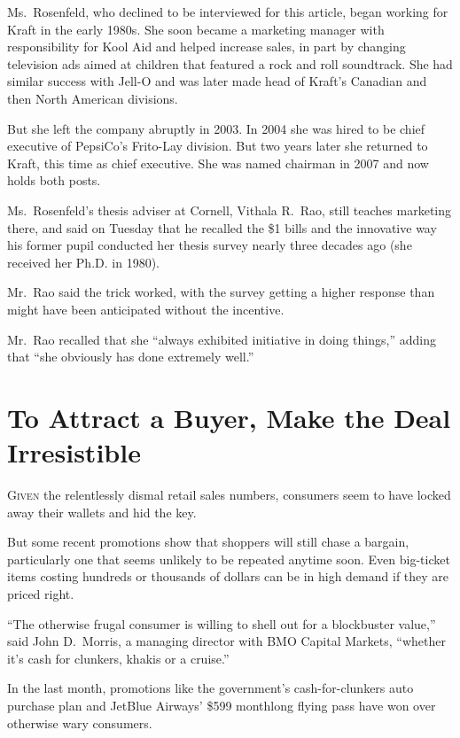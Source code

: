 ﻿\documentclass[12pt]{article}
\begin{document}
Ms.~Rosenfeld, who declined to be interviewed for this article, began working for Kraft in the early
1980s. She soon became a marketing manager with responsibility for Kool Aid and helped increase
sales, in part by changing television ads aimed at children that featured a rock and roll
soundtrack. She had similar success with Jell-O and was later made head of Kraft's Canadian and then
North American divisions.

But she left the company abruptly in 2003. In 2004 she was hired to be chief executive of PepsiCo's
Frito-Lay division. But two years later she returned to Kraft, this time as chief executive. She was
named chairman in 2007 and now holds both posts.

Ms.~Rosenfeld's thesis adviser at Cornell, Vithala R.~Rao, still teaches marketing there, and said
on Tuesday that he recalled the \$1 bills and the innovative way his former pupil conducted her
thesis survey nearly three decades ago (she received her Ph.D. in 1980).

Mr.~Rao said the trick worked, with the survey getting a higher response than might have been
anticipated without the incentive.

Mr.~Rao recalled that she ``always exhibited initiative in doing things,'' adding that ``she
obviously has done extremely well.''

\section{To Attract a Buyer, Make the Deal Irresistible}

\lettrine{G}{iven} the relentlessly dismal\cite{dismal} retail sales numbers, consumers seem to have
locked away their wallets and hid the key.

But some recent promotions show that shoppers will still chase a bargain, particularly one that
seems unlikely to be repeated anytime soon. Even big-ticket items costing hundreds or thousands of
dollars can be in high demand if they are priced right.

``The otherwise frugal\cite{frugal} consumer is willing to shell out for a blockbuster value,'' said
John D.~Morris, a managing director with BMO Capital Markets, ``whether it's cash for clunkers,
khakis or a cruise.''

In the last month, promotions like the government's cash-for-clunkers auto purchase plan and JetBlue
Airways' \$599 monthlong flying pass have won over otherwise wary consumers.
\end{document}
